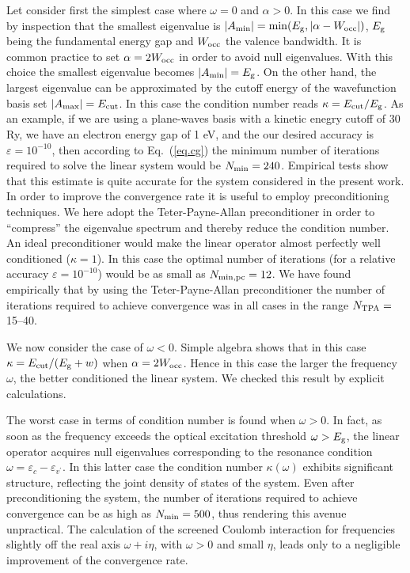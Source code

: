 \documentclass[twocolumn,prb,showpacs,superscriptaddress]{revtex4}
\def\w{\omega}
\def\E{\varepsilon}
\def\vp{{v^\prime}}
\begin{document}
Let consider first the simplest case where $\w=0$ and $\alpha>0$. In this case 
we find by inspection that the smallest eigenvalue is $|A_{\rm min}|= \min(E_{\rm g}, |\alpha-W_{\rm occ}|)$, 
$E_{\rm g}$ being the fundamental energy gap and $W_{\rm occ}$ the valence bandwidth.
It is common practice to set $\alpha=2W_{\rm occ}$ in order to avoid null eigenvalues.
\cite{baroni.rmp} With this choice the smallest eigenvalue becomes $|A_{\rm min}|=E_{\rm g}$.
On the other hand, the largest eigenvalue can be approximated by the
cutoff energy of the wavefunction basis set $|A_{\rm max}|=E_{\rm cut}$.
In this case the condition number reads $\kappa = E_{\rm cut}/E_{\rm g}$.
As an example, if we are using a plane-waves basis with a kinetic enegry
cutoff of 30 Ry, we have an electron energy gap of 1 eV, 
and the our desired accuracy is $\varepsilon=10^{-10}$, then according to
Eq.\ (\ref{eq.cg}) the minimum number of iterations required to solve 
the linear system would be $N_{\rm min} = 240$. Empirical tests show that 
this estimate is quite accurate for the system considered in the present work.
In order to improve the convergence rate it is useful to employ preconditioning
techniques. We here adopt the Teter-Payne-Allan preconditioner\cite{tpa}
in order to ``compress'' the eigenvalue spectrum and thereby reduce the
condition number. An ideal preconditioner would make the linear operator
almost perfectly well conditioned ($\kappa=1$). In this case
the optimal  number of iterations (for a relative accuracy $\varepsilon=10^{-10}$) 
would be as small as $N_{\rm min,pc} = 12$. We have found empirically
that by using the Teter-Payne-Allan 
preconditioner the number of iterations
required to achieve convergence was in all cases in the range $N_{\rm TPA}=$15--40. 

We now consider the case of $\w<0$. Simple algebra shows that in this case
$\kappa = E_{\rm cut}/(E_{\rm g} + w)$
when $\alpha = 2W_{\rm occ}$. Hence in this case the larger the frequency $\w$,
the better conditioned the linear system. We checked this result
by explicit calculations.

The worst case in terms of condition number is found when $\w>0$. 
In fact, as soon as the frequency exceeds the optical excitation
threshold $\w>E_{\rm g}$, the linear operator acquires null eigenvalues 
corresponding to the resonance condition $\w = \E_c - \E_\vp$. 
In this latter case the condition
number $\kappa(\w)$ exhibits significant structure, reflecting
the joint density of states of the system. Even after preconditioning the system, 
the number of iterations required to achieve convergence can be as high as 
$N_{\rm min} = 500$, thus rendering this avenue unpractical.
The calculation of the screened Coulomb interaction for frequencies slightly
off the real axis $\w+i\eta$, with $\w>0$ and small $\eta$, leads only to a negligible
improvement of the convergence rate.
\end{document}
